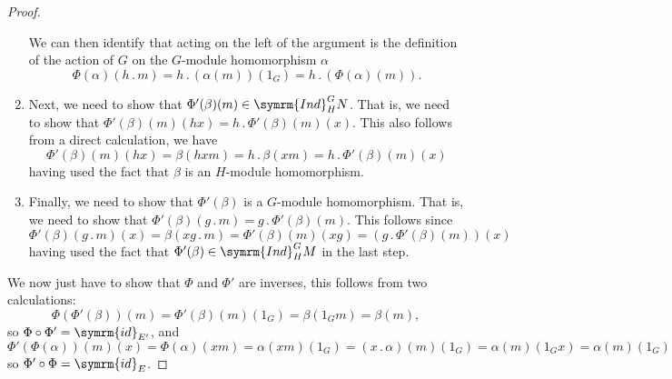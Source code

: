 \documentclass[fleqn]{NotesClass}
\newcommand{\id}{\symrm{id}}
\newcommand{\action}{\mathbin{.}}
\newcommand{\Ind}{\symrm{Ind}}
\begin{document}
\begin{thm}{}{}
\begin{proof}
\begin{enumerate}
\begin{equation}
                \end{equation}
                We can then identify that acting on the left of the argument is the definition of the action of \(G\) on the \(G\)-module homomorphism \(\alpha\)
                \begin{equation}
                    \Phi(\alpha)(h \action m) = h \action (\alpha (m))(1_G) = h \action (\Phi(\alpha)(m)).
                \end{equation}
                \item Next, we need to show that \(\Phi'(\beta)(m) \in \Ind^G_HN\).
                That is, we need to show that \(\Phi'(\beta)(m)(hx) = h \action \Phi'(\beta)(m)(x)\).
                This also follows from a direct calculation, we have
                \begin{equation}
                    \Phi'(\beta)(m)(hx) = \beta(hxm) = h \action \beta(xm) = h \action \Phi'(\beta)(m)(x)
                \end{equation}
                having used the fact that \(\beta\) is an \(H\)-module homomorphism.
                \item Finally, we need to show that \(\Phi'(\beta)\) is a \(G\)-module homomorphism.
                That is, we need to show that \(\Phi'(\beta)(g \action m) = g \action \Phi'(\beta)(m)\).
                This follows since
                \begin{equation}
                    \Phi'(\beta)(g \action m)(x) = \beta(xg \action m) = \Phi'(\beta)(m)(xg) = (g \action \Phi'(\beta)(m))(x)
                \end{equation}
                having used the fact that \(\Phi'(\beta) \in \Ind^G_H M\) in the last step.
            \end{enumerate}
            
            We now just have to show that \(\Phi\) and \(\Phi'\) are inverses, this follows from two calculations:
            \begin{equation}
                \Phi(\Phi'(\beta))(m) = \Phi'(\beta)(m)(1_G) = \beta(1_Gm) = \beta(m),
            \end{equation}
            so \(\Phi \circ \Phi' = \id_{E'}\), and
            \begin{equation}
                \Phi'(\Phi(\alpha))(m)(x) = \Phi(\alpha)(xm) = \alpha(xm)(1_G) = (x \action \alpha)(m)(1_G) = \alpha(m)(1_Gx) = \alpha(m)(1_G)
            \end{equation}
            so \(\Phi' \circ \Phi = \id_E\).
        \end{proof}
    \end{thm}
    
    
	\appendixpage
	\begin{appendices}
	    
	\end{appendices}

    \backmatter
    \renewcommand{\glossaryname}{Acronyms}
    \printglossary[acronym]
    \printindex
\end{document}
